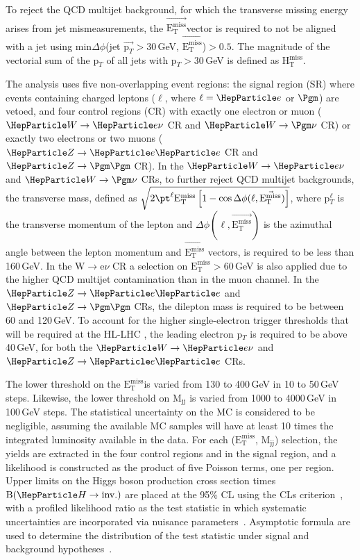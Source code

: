 \documentclass[../report.tex]{subfiles}
\newcommand{\MET}{\ensuremath{\mathrm{E}_{\mathrm{T}}^{\mathrm{miss}}}}
\newcommand{\MHT}{\ensuremath{\mathrm{H}_{\mathrm{T}}^{\mathrm{miss}}}}
\newcommand{\METvec}{\ensuremath{\vec{\MET}}}
\newcommand{\ptvec}{\ensuremath{\vec{\mathrm{p}_{T}}}}
\newcommand{\BHinv}{\ensuremath{\text{B}(\PH\to \text{inv.})}\xspace}
\begin{document}
To reject the QCD multijet background, for which the transverse
missing energy arises from jet mismeasurements, the \METvec vector is
required to not be aligned with a jet using min$\Delta\phi$(jet
\ptvec$>30$\,GeV, \METvec)$>0.5$. The magnitude of the vectorial sum of
the p$_{T}$ of all jets with p$_{T}>30$\,GeV is defined as \MHT.

The analysis uses five non-overlapping event regions: the signal
region (SR) where events containing charged leptons ($\ell$, where
$\ell=\Pe$ or $\Pgm$) are vetoed, and four control regions (CR) with
exactly one electron or muon ($\PW\rightarrow\Pe\nu$ CR and
$\PW\rightarrow\Pgm\nu$ CR) or exactly two electrons or two muons
($\PZ\rightarrow\Pe\Pe$ CR and $\PZ\rightarrow\Pgm\Pgm$ CR).  In the
$\PW\rightarrow\Pe\nu$ and $\PW\rightarrow\Pgm\nu$ CRs, to further
reject QCD multijet backgrounds, the transverse mass, defined as
$\sqrt{2\pt^{\ell}\MET\left[1
- \cos{\Delta\phi(\ell,\METvec)}\right]}$, where p$_{T}^{\ell}$ is the
transverse momentum of the lepton and $\Delta\phi(\ell,\METvec)$ is
the azimuthal angle between the lepton momentum and $\METvec$ vectors,
is required to be less than 160\,GeV. In the W$\rightarrow$e$\nu$ CR a
selection on \MET$>60$\,GeV is also applied due to the higher QCD
multijet contamination than in the muon channel. In the
$\PZ\rightarrow\Pe\Pe$ and $\PZ\rightarrow\Pgm\Pgm$ CRs, the dilepton
mass is required to be between 60 and 120\,GeV. To account for the
higher single-electron trigger thresholds that will be required at the
HL-LHC , the leading electron p$_{T}$ is required to be above 40\,GeV,
for both the $\PW\rightarrow\Pe\nu$ and $\PZ\rightarrow\Pe\Pe$ CRs.

The lower threshold on the \MET is varied from 130 to 400\,GeV in 10 to
50\,GeV steps. Likewise, the lower threshold on M$_{\text{jj}}$ is
varied from 1000 to 4000\,GeV in 100\,GeV steps. The statistical
uncertainty on the MC is considered to be negligible, assuming the
available MC samples will have at least 10 times the integrated
luminosity available in the data.  For each (\MET, M$_{\text{jj}}$)
selection, the yields are extracted in the four control regions and in
the signal region, and a likelihood is constructed as the product of
five Poisson terms, one per region.  Upper limits on the Higgs boson
production cross section times
\BHinv are placed at the 95\% CL using the CLs
criterion~\cite{Read1,junkcls,Dittmaier:2012vm}, with a profiled
likelihood ratio as the test statistic in which systematic
uncertainties are incorporated via nuisance
parameters~\cite{Chatrchyan:2013lba,HiggsCombination}. Asymptotic
formula are used to determine the distribution of the test statistic
under signal and background hypotheses~\cite{Cowan:2010js}.
\end{document}
